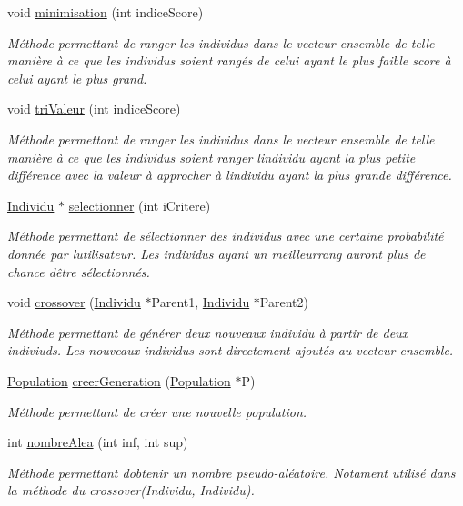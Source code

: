 \begin{DoxyCompactItemize}
void \hyperlink{class_population_a6f27e76b6b15668b343c43c56027515d}{minimisation} (int indice\+Score)
\begin{DoxyCompactList}\small\item\em Méthode permettant de ranger les individus dans le vecteur ensemble de telle manière à ce que les individus soient rangés de celui ayant le plus faible score à celui ayant le plus grand. \end{DoxyCompactList}\item 
void \hyperlink{class_population_a4b167d07f145a1f1ea69b2bb4cfd2cfb}{tri\+Valeur} (int indice\+Score)
\begin{DoxyCompactList}\small\item\em Méthode permettant de ranger les individus dans le vecteur ensemble de telle manière à ce que les individus soient ranger l\textquotesingle{}individu ayant la plus petite différence avec la valeur à approcher à l\textquotesingle{}individu ayant la plus grande différence. \end{DoxyCompactList}\item 
\hyperlink{class_individu}{Individu} $\ast$ \hyperlink{class_population_a30fcbcf36eb009493208310fecdf3729}{selectionner} (int i\+Critere)
\begin{DoxyCompactList}\small\item\em Méthode permettant de sélectionner des individus avec une certaine probabilité donnée par l\textquotesingle{}utilisateur. Les individus ayant un meilleurrang auront plus de chance d\textquotesingle{}être sélectionnés. \end{DoxyCompactList}\item 
void \hyperlink{class_population_a728129af67cfe97c0fa16d0728101a28}{crossover} (\hyperlink{class_individu}{Individu} $\ast$Parent1, \hyperlink{class_individu}{Individu} $\ast$Parent2)
\begin{DoxyCompactList}\small\item\em Méthode permettant de générer deux nouveaux individu à partir de deux indiviuds. Les nouveaux individus sont directement ajoutés au vecteur ensemble. \end{DoxyCompactList}\item 
\hyperlink{class_population}{Population} \hyperlink{class_population_af3c4abb60e3dcd0eb183014a9d21419c}{creer\+Generation} (\hyperlink{class_population}{Population} $\ast$P)
\begin{DoxyCompactList}\small\item\em Méthode permettant de créer une nouvelle population. \end{DoxyCompactList}\item 
int \hyperlink{class_population_a0bacc7dadc8ab903261ff053344a9e36}{nombre\+Alea} (int inf, int sup)
\begin{DoxyCompactList}\small\item\em Méthode permettant d\textquotesingle{}obtenir un nombre pseudo-\/aléatoire. Notament utilisé dans la méthode du crossover(\+Individu, Individu). \end{DoxyCompactList}\end{DoxyCompactItemize}


